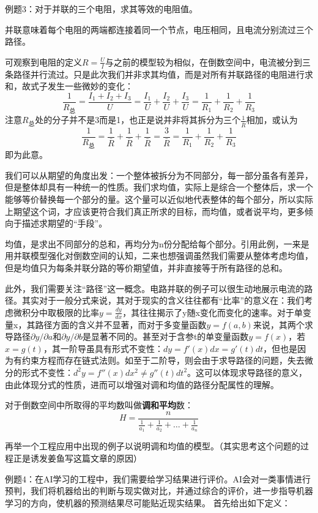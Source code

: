 \documentclass[fontset=none]{ctexart}
\begin{document}
\lishu
例题3：对于并联的三个电阻，求其等效的电阻值。

并联意味着每个电阻的两端都连接着同一个节点，电压相同，且电流分别流过三个路径。

可观察到电阻的定义$R = \frac{U}{I}$与之前的模型较为相似，在倒数空间中，电流被分到三条路径并行流过。只是此次我们并非求其均值，而是对所有并联路径的电阻进行求和，故式子发生一些微妙的变化：$$\frac{1}{R_\text{总}}=\frac{I_1+I_2+I_3}{U}=\frac{I_1}{U}+\frac{I_2}{U}+\frac{I_3}{U}=\frac{1}{R_1}+\frac{1}{R_2}+\frac{1}{R_3}$$注意$R_\text{总}$处的分子并不是3而是1，也正是说并非将其拆分为三个$\frac{1}{\bar{R}}$相加，或认为$$\frac{1}{R_\text{总}}=\frac{1}{\bar{R}}+\frac{1}{\bar{R}}+\frac{1}{\bar{R}}=\frac{3}{\bar{R}}=\frac{1}{R_1}+\frac{1}{R_2}+\frac{1}{R_3}$$即为此意。

\kaishu
我们可以从期望的角度出发：一个整体被拆分为不同部分，每一部分虽各有差异，但是整体却具有一种统一的性质。我们求均值，实际上是综合一个整体后，求一个能够等价替换每一个部分的量。这个量可以近似地代表整体的每个部分，所以实际上期望这个词，才应该更符合我们真正所求的目标，而均值，或者说平均，更多倾向于描述求期望的“手段”。

均值，是求出不同部分的总和，再均分为n份分配给每个部分。引用此例，一来是用并联模型强化对倒数空间的认知，二来也想强调虽然我们需要从整体考虑均值，但是均值只为每条并联分路的等价期望值，并非直接等于所有路径的总和。

此外，我们需要关注“路径”这一概念。电路并联的例子可以很生动地展示电流的路径。其实对于一般分式来说，其对于现实的含义往往都有“比率”的意义在：我们考虑微积分中取极限的比率$y=\frac{dy}{dx}$，其往往揭示了y随x变化而变化的速率。对于单变量x，其路径方面的含义并不显著，而对于多变量函数$y=f(a,b)$来说，其两个求导路径$\partial y/\partial a\text{和}\partial y/\partial b$是显著不同的。甚至对于含参t的单变量函数$y=f(x)$，若$x=g(t)$，其一阶导虽具有形式不变性：$dy=f'(x)dx=g'(t)dt$，但也是因为有约束方程而存在链式法则。如至于二阶导，则会由于求导路径的问题，失去微分的形式不变性：$d^2y=f''(x)dx^2\ne g''(t)dt^2$。这可以体现求导路径的意义，由此体现分式的性质，进而可以增强对调和均值的路径分配属性的理解。

对于倒数空间中所取得的平均数叫做\textbf{调和平均}数：$$H = \frac{n}{\frac{1}{a_1} + \frac{1}{a_2} + \dots + \frac{1}{a_n}}$$

再举一个工程应用中出现的例子以说明调和均值的模型。（其实思考这个问题的过程正是诱发姜鱼写这篇文章的原因）

\lishu
例题4：在AI学习的工程中，我们需要给学习结果进行评价。AI会对一类事情进行预判，我们将机器给出的判断与现实做对比，并通过综合的评价，进一步指导机器学习的方向，使机器的预测结果尽可能贴近现实结果。
首先给出如下定义：
\end{document}
